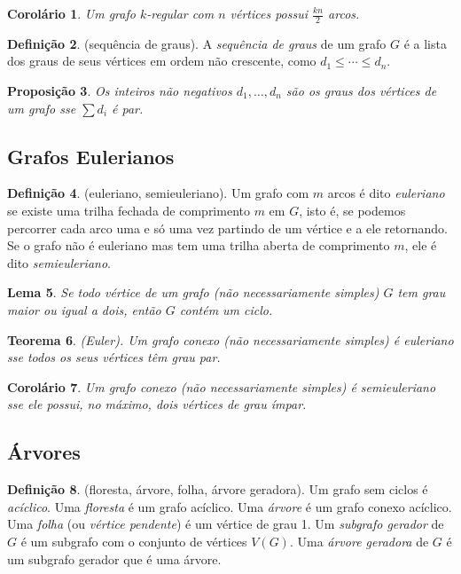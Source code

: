 \documentclass{article}
\theoremstyle{plain}
\newtheorem{thm}{Teorema}[section]
\newtheorem{prop}[thm]{Proposição}
\newtheorem{lem}[thm]{Lema}
\newtheorem{cor}[thm]{Corolário}
\theoremstyle{definition}
\newtheorem{defn}[thm]{Definição}
\theoremstyle{remark}
\begin{document}
\begin{cor}
    Um grafo \(k\)-regular com \(n\) vértices possui \(\displaystyle \frac{kn}{2}\) arcos.
\end{cor}

\begin{defn} (sequência de graus).
    A \emph{sequência de graus} de um grafo \(G\) é a lista dos graus de seus vértices em ordem não crescente, como \(d_1 \leq \cdots \leq d_n\).
\end{defn}

\begin{prop}
    Os inteiros não negativos \(d_1, \ldots, d_n\) são os graus dos vértices de um grafo sse \(\sum d_i\) é par.
\end{prop}

\subsection{Grafos Eulerianos}

\begin{defn} (euleriano, semieuleriano).
    Um grafo com \(m\) arcos é dito \emph{euleriano} se existe uma trilha fechada de comprimento \(m\) em \(G\), isto é, se podemos percorrer cada arco uma e só uma vez partindo de um vértice e a ele retornando.
    Se o grafo não é euleriano mas tem uma trilha aberta de comprimento \(m\), ele é dito \emph{semieuleriano}.
\end{defn}

\begin{lem}
    Se todo vértice de um grafo (não necessariamente simples) \(G\) tem grau maior ou igual a dois, então \(G\) contém um ciclo.
\end{lem}

\begin{thm} (Euler).
    Um grafo conexo (não necessariamente simples) é euleriano sse todos os seus vértices têm grau par.
\end{thm}

\begin{cor}
    Um grafo conexo (não necessariamente simples) é semieuleriano sse ele possui, no máximo, dois vértices de grau ímpar.
\end{cor}

\subsection{Árvores}

\begin{defn} (floresta, árvore, folha, árvore geradora).
    Um grafo sem ciclos é \emph{acíclico}. Uma \emph{floresta} é um grafo acíclico. Uma \emph{árvore} é um grafo conexo acíclico. Uma \emph{folha} (ou \emph{vértice pendente}) é um vértice de grau 1. Um \emph{subgrafo gerador} de \(G\) é um subgrafo com o conjunto de vértices \(V(G)\). Uma \emph{árvore geradora} de \(G\) é um subgrafo gerador que é uma árvore.
\end{defn}
\end{document}
